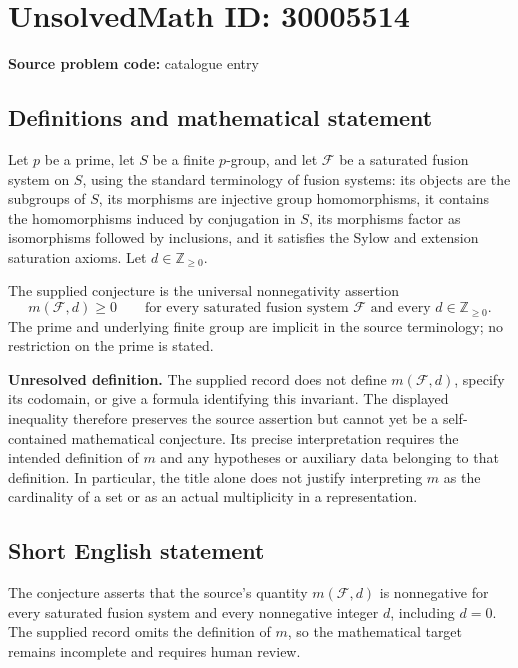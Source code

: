 \documentclass[11pt]{article}
\begin{document}
\section*{UnsolvedMath ID: 30005514}
\textbf{Source problem code:} catalogue entry
\subsection{Definitions and mathematical statement}
Let \(p\) be a prime, let \(S\) be a finite \(p\)-group, and let \(\mathcal F\) be a saturated fusion system on \(S\), using the standard terminology of fusion systems: its objects are the subgroups of \(S\), its morphisms are injective group homomorphisms, it contains the homomorphisms induced by conjugation in \(S\), its morphisms factor as isomorphisms followed by inclusions, and it satisfies the Sylow and extension saturation axioms. Let \(d\in\mathbb Z_{\geq 0}\).

The supplied conjecture is the universal nonnegativity assertion
\[
 m(\mathcal F,d)\geq 0
 \qquad\text{for every saturated fusion system }\mathcal F
 \text{ and every }d\in\mathbb Z_{\geq 0}.
\]
The prime and underlying finite group are implicit in the source terminology; no restriction on the prime is stated.

\textbf{Unresolved definition.} The supplied record does not define \(m(\mathcal F,d)\), specify its codomain, or give a formula identifying this invariant. The displayed inequality therefore preserves the source assertion but cannot yet be a self-contained mathematical conjecture. Its precise interpretation requires the intended definition of \(m\) and any hypotheses or auxiliary data belonging to that definition. In particular, the title alone does not justify interpreting \(m\) as the cardinality of a set or as an actual multiplicity in a representation.
\subsection{Short English statement}
The conjecture asserts that the source's quantity \(m(\mathcal F,d)\) is nonnegative for every saturated fusion system and every nonnegative integer \(d\), including \(d=0\). The supplied record omits the definition of \(m\), so the mathematical target remains incomplete and requires human review.
\end{document}
